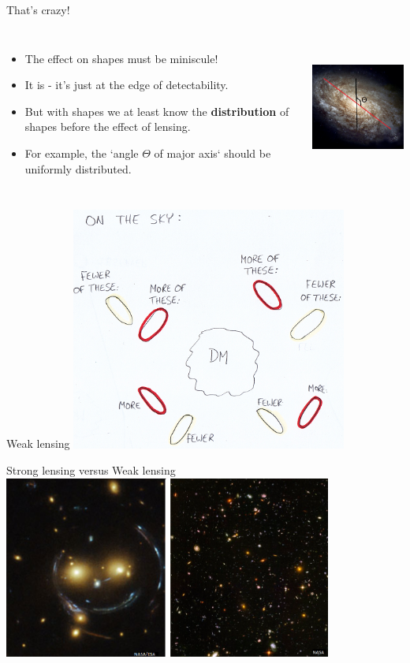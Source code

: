 \documentclass[usenames,dvipsnames]{beamer}
\begin{document}
\begin{frame}{That's crazy!}
  \begin{columns}
    \begin{itemize}
      \item{The effect on shapes must be miniscule!}
      \item{It is - it's just at the edge of detectability.}
      \item{But with shapes we at least know the \textbf{distribution} of shapes before the effect of lensing.}
      \item{For example, the `angle $\Theta$ of major axis` should be uniformly distributed.}
    \end{itemize}
    \centering
    \includegraphics[height=4.5cm]{diagram_2.png}
  \end{columns}
\end{frame}

\begin{frame}{Weak lensing}
    \centering
    \includegraphics[height=8cm]{diagram_3.png}
\end{frame}

\begin{frame}{Strong lensing versus Weak lensing}
    \centering
    \includegraphics[height=6cm]{diagram_4.png}
\end{frame}
\end{document}
